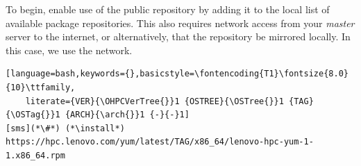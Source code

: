 To begin, enable use of the public \Confluent{} repository by adding it to the local list
of available package repositories. This also requires network access from
your {\em master} server to the internet, or alternatively, that
the repository be mirrored locally. In this case, we use the network.

\begin{lstlisting}[language=bash,keywords={},basicstyle=\fontencoding{T1}\fontsize{8.0}{10}\ttfamily,
	literate={VER}{\OHPCVerTree{}}1 {OSTREE}{\OSTree{}}1 {TAG}{\OSTag{}}1 {ARCH}{\arch{}}1 {-}{-}1]
[sms](*\#*) (*\install*) https://hpc.lenovo.com/yum/latest/TAG/x86_64/lenovo-hpc-yum-1-1.x86_64.rpm
\end{lstlisting}
